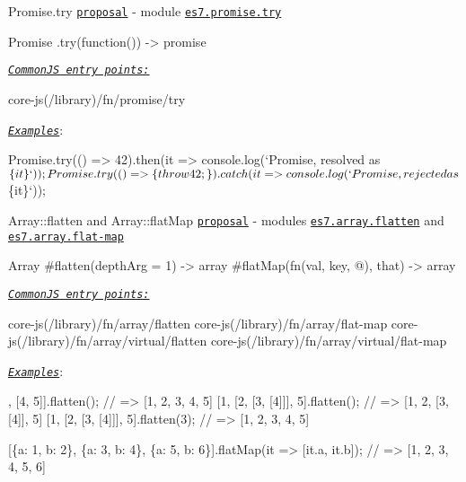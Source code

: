 \begin{DoxyItemize}
\item {\ttfamily Promise.\+try} \href{https://github.com/tc39/proposal-promise-try}{\tt proposal} -\/ module \href{https://github.com/zloirock/core-js/blob/v2.6.0/modules/es7.promise.try.js}{\tt {\ttfamily es7.\+promise.\+try}} 
\begin{DoxyCode}
Promise
  .try(function()) -> promise
\end{DoxyCode}
 \href{#commonjs}{\tt {\itshape Common\+JS entry points\+:}} 
\begin{DoxyCode}
core-js(/library)/fn/promise/try
\end{DoxyCode}
 \href{https://goo.gl/k5GGRo}{\tt {\itshape Examples}}\+: 
\begin{DoxyCode}
Promise.try(() => 42).then(it => console.log(`Promise, resolved as $\{it\}`));

Promise.try(() => \{ throw 42; \}).catch(it => console.log(`Promise, rejected as $\{it\}`));
\end{DoxyCode}

\item {\ttfamily Array\+::flatten} and {\ttfamily Array\+::flat\+Map} \href{https://tc39.github.io/proposal-flatMap}{\tt proposal} -\/ modules \href{https://github.com/zloirock/core-js/blob/v2.6.0/modules/es7.array.flatten.js}{\tt {\ttfamily es7.\+array.\+flatten}} and \href{https://github.com/zloirock/core-js/blob/v2.6.0/modules/es7.array.flat-map.js}{\tt {\ttfamily es7.\+array.\+flat-\/map}} 
\begin{DoxyCode}
Array
  #flatten(depthArg = 1) -> array
  #flatMap(fn(val, key, @), that) -> array
\end{DoxyCode}
 \href{#commonjs}{\tt {\itshape Common\+JS entry points\+:}} 
\begin{DoxyCode}
core-js(/library)/fn/array/flatten
core-js(/library)/fn/array/flat-map
core-js(/library)/fn/array/virtual/flatten
core-js(/library)/fn/array/virtual/flat-map
\end{DoxyCode}
 \href{https://goo.gl/jTXsZi}{\tt {\itshape Examples}}\+: 
\begin{DoxyCode}
[1, [2, 3], [4, 5]].flatten();    // => [1, 2, 3, 4, 5]
[1, [2, [3, [4]]], 5].flatten();  // => [1, 2, [3, [4]], 5]
[1, [2, [3, [4]]], 5].flatten(3); // => [1, 2, 3, 4, 5]

[\{a: 1, b: 2\}, \{a: 3, b: 4\}, \{a: 5, b: 6\}].flatMap(it => [it.a, it.b]); // => [1, 2, 3, 4, 5, 6]
\end{DoxyCode}


\end{DoxyItemize}
